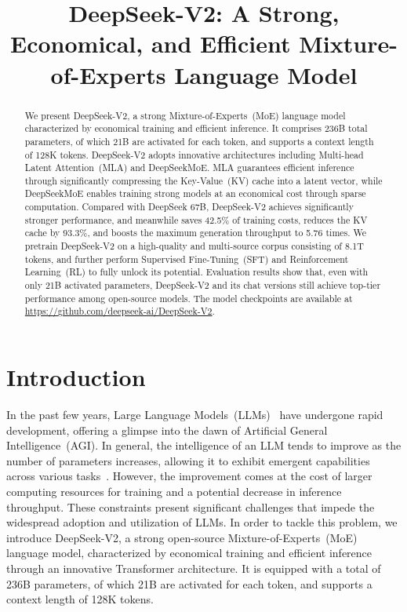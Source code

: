 \title{DeepSeek-V2: A Strong, Economical, and Efficient Mixture-of-Experts Language Model}

\begin{abstract}
We present DeepSeek-V2, a strong Mixture-of-Experts~(MoE) language model characterized by economical training and efficient inference. It comprises 236B total parameters, of which 21B are activated for each token, and supports a context length of 128K tokens. DeepSeek-V2 adopts innovative architectures including Multi-head Latent Attention~(MLA) and DeepSeekMoE. MLA guarantees efficient inference through significantly compressing the Key-Value~(KV) cache into a latent vector, while DeepSeekMoE enables training strong models at an economical cost through sparse computation. Compared with DeepSeek 67B, DeepSeek-V2 achieves significantly stronger performance, and meanwhile saves 42.5\% of training costs, reduces the KV cache by 93.3\%, and boosts the maximum generation throughput to 5.76 times. We pretrain DeepSeek-V2 on a high-quality and multi-source corpus consisting of 8.1T tokens, and further perform Supervised Fine-Tuning~(SFT) and Reinforcement Learning~(RL) to fully unlock its potential. Evaluation results show that, even with only 21B activated parameters, DeepSeek-V2 and its chat versions still achieve top-tier performance among open-source models. The model checkpoints are available at \url{https://github.com/deepseek-ai/DeepSeek-V2}.
\end{abstract}

\section{Introduction}

In the past few years, Large Language Models~(LLMs)~\citep{chatgpt,gpt4,claude,gemini} have undergone rapid development, offering a glimpse into the dawn of Artificial General Intelligence~(AGI). In general, the intelligence of an LLM tends to improve as the number of parameters increases, allowing it to exhibit emergent capabilities across various tasks~\citep{wei2022emergent}. However, the improvement comes at the cost of larger computing resources for training and a potential decrease in inference throughput. These constraints present significant challenges that impede the widespread adoption and utilization of LLMs. In order to tackle this problem, we introduce DeepSeek-V2, a strong open-source Mixture-of-Experts~(MoE) language model, characterized by economical training and efficient inference through an innovative Transformer architecture. It is equipped with a total of 236B parameters, of which 21B are activated for each token, and supports a context length of 128K tokens. 

